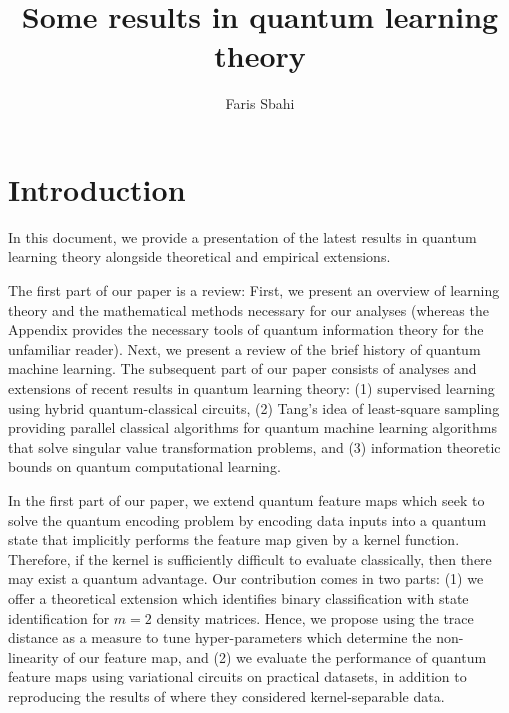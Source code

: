 \documentclass{book}
\date{}
\title{Some results in quantum learning theory}
\author{Faris Sbahi}
\newcommand\0{\mathbf{0}}
\newcommand\<{\langle}
\renewcommand\>{\rangle}
\begin{document}
\maketitle


\tableofcontents

\chapter{Introduction}

In this document, we provide a presentation of the latest results in quantum learning theory alongside theoretical and empirical extensions. 

The first part of our paper is a review: First, we present an overview of learning theory and the mathematical methods necessary for our analyses (whereas the Appendix provides the necessary tools of quantum information theory for the unfamiliar reader). Next, we present a review of the brief history of quantum machine learning. The subsequent part of our paper consists of analyses and extensions of recent results in quantum learning theory: (1) supervised learning using hybrid quantum-classical circuits, (2) Tang's \cite{tang2018quantum} idea of least-square sampling providing parallel classical algorithms for quantum machine learning algorithms that solve singular value transformation problems, and (3) information theoretic bounds on quantum computational learning.

In the first part of our paper, we extend quantum feature maps which seek to solve the quantum encoding problem by encoding data inputs into a quantum state that implicitly performs the feature map given by a kernel function. Therefore, if the kernel is sufficiently difficult to evaluate classically, then there may exist a quantum advantage. Our contribution comes in two parts: (1) we offer a theoretical extension which identifies binary classification with state identification for $m=2$ density matrices. Hence, we propose using the trace distance as a measure to tune hyper-parameters which determine the non-linearity of our feature map, and (2) we evaluate the performance of quantum feature maps using variational circuits on practical datasets, in addition to reproducing the results of \cite{havlicek2018supervised} where they considered kernel-separable data.
\end{document}
